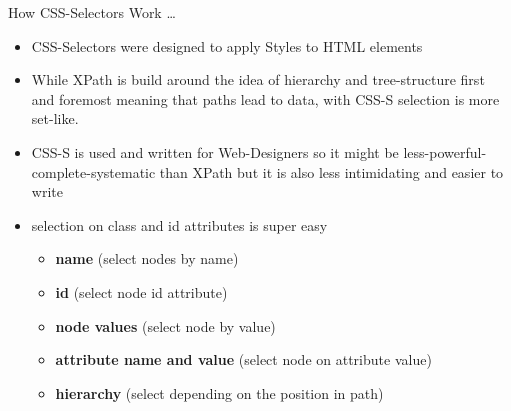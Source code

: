 \documentclass[ignorenonframetext,]{beamer}
\providecommand{\tightlist}{%
  \setlength{\itemsep}{0pt}\setlength{\parskip}{0pt}}
\begin{document}
\begin{frame}{How CSS-Selectors Work \ldots{}}

\begin{itemize}
\tightlist
\item
  CSS-Selectors were designed to apply Styles to HTML elements
\item
  While XPath is build around the idea of hierarchy and tree-structure
  first and foremost meaning that paths lead to data, with CSS-S
  selection is more set-like.
\item
  CSS-S is used and written for Web-Designers so it might be
  less-powerful-complete-systematic than XPath but it is also less
  intimidating and easier to write
\item
  selection on class and id attributes is super easy

  \begin{itemize}
  \tightlist
  \item
    \textbf{name} (select nodes by name)
  \item
    \textbf{id} (select node id attribute)
  \item
    \textbf{node values} (select node by value)
  \item
    \textbf{attribute name and value} (select node on attribute value)
  \item
    \textbf{hierarchy} (select depending on the position in path)
  \end{itemize}
\end{itemize}

\end{frame}
\end{document}
